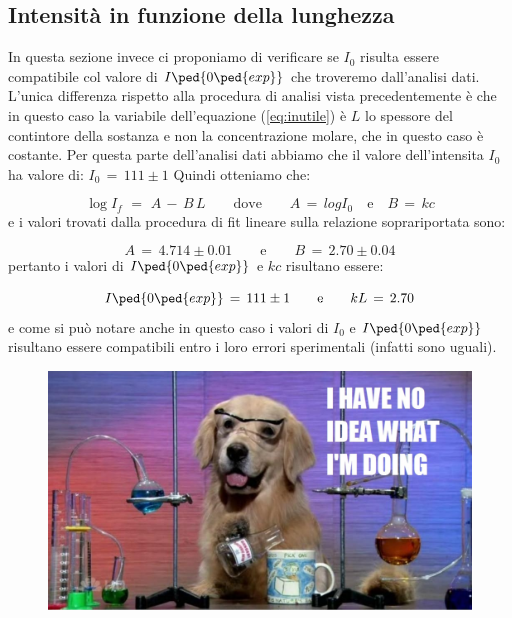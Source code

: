 \subsection{Intensità in funzione della lunghezza}

In questa sezione invece ci proponiamo di verificare se $I_0$ risulta essere compatibile col valore di $I\ped{0\ped{exp}}$ che troveremo dall'analisi dati. L'unica differenza rispetto alla procedura di analisi vista precedentemente è che in questo caso la variabile dell'equazione (\ref{eq:inutile}) è $L$ lo spessore del contintore della sostanza e non la concentrazione molare, che in questo caso è costante.
Per questa parte dell'analisi dati abbiamo che il valore dell'intensita $I_0$ ha valore di: $I_0 \,=\, 111 \pm 1$
Quindi otteniamo che:

\begin{equation}
	\log{I_f} \,\,=\,\, A \,-\, B \, L \qquad \text{dove} \qquad A \,=\, log{I_0} \quad \text{e} \quad B\,=\, kc
	\label{eq:fit}
\end{equation}
%
e i valori trovati dalla procedura di fit lineare sulla relazione soprariportata sono:

\begin{equation*}
	A \,=\, 4.714 \pm 0.01 \qquad \text{e} \qquad B \,=\, 2.70 \pm 0.04
\end{equation*}
%
pertanto i valori di $I\ped{0\ped{exp}}$ e $kc$ risultano essere:

\begin{equation}
	I\ped{0\ped{exp}} \,=\, 111 \pm 1 \qquad \text{e} \qquad kL \,=\, 2.70
\end{equation}
%
e come si può notare anche in questo caso i valori di $I_0$ e $I\ped{0\ped{exp}}$  risultano essere compatibili entro i loro errori sperimentali (infatti sono uguali).

\begin{figure}[hbtp]
        \centering
        \includegraphics[scale=0.4]{chem_dog.pdf}
\end{figure}
